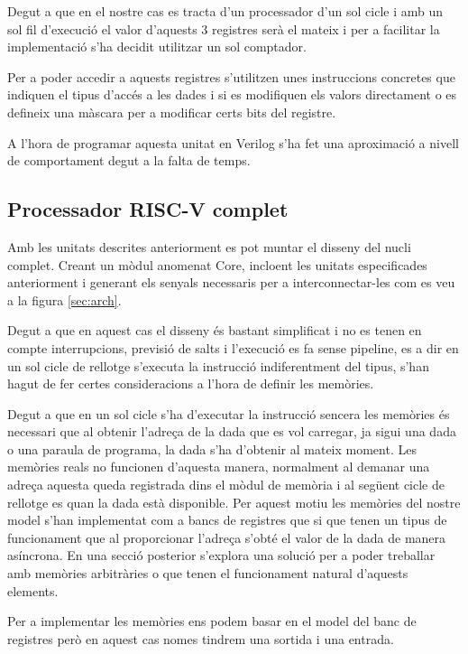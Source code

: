 \documentclass[10pt,a4paper,twocolumn,twoside]{article}
\begin{document}
    Degut a que en el nostre cas es tracta d'un processador d'un sol cicle i amb un sol fil d'execució el valor d'aquests 3 registres serà el mateix i per a facilitar la implementació s'ha decidit utilitzar un sol comptador.
    
    Per a poder accedir a aquests registres s'utilitzen unes instruccions concretes que indiquen el tipus d'accés a les dades i si es modifiquen els valors directament o es defineix una màscara per a modificar certs bits del registre.
    
    A l'hora de programar aquesta unitat en Verilog s'ha fet una aproximació a nivell de comportament degut a la falta de temps.
    

    
    \subsection{Processador RISC-V complet}
    
    Amb les unitats descrites anteriorment es pot muntar el disseny del nucli complet. Creant un mòdul anomenat Core, incloent les unitats especificades anteriorment i generant els senyals necessaris per a interconnectar-les com es veu a la figura \ref{sec:arch}.
    
    Degut a que en aquest cas el disseny és bastant simplificat i no es tenen en compte interrupcions, previsió de salts i l'execució es fa sense pipeline, es a dir en un sol cicle de rellotge s'executa la instrucció indiferentment del tipus, s'han hagut de fer certes consideracions a l'hora de definir les memòries.
    
    Degut a que en un sol cicle s'ha d'executar la instrucció sencera les memòries és necessari que al obtenir l'adreça de la dada que es vol carregar, ja sigui una dada o una paraula de programa, la dada s'ha d'obtenir al mateix moment. Les memòries reals no funcionen d'aquesta manera, normalment al demanar una adreça aquesta queda registrada dins el mòdul de memòria i al següent cicle de rellotge es quan la dada està disponible. Per aquest motiu les memòries del nostre model s'han implementat com a bancs de registres que si que tenen un tipus de funcionament que al proporcionar l'adreça s'obté el valor de la dada de manera asíncrona. En una secció posterior s'explora una solució per a poder treballar amb memòries arbitràries o que tenen el funcionament natural d'aquests elements.
    
    Per a implementar les memòries ens podem basar en el model del banc de registres però en aquest cas nomes tindrem una sortida i una entrada.
\end{document}
